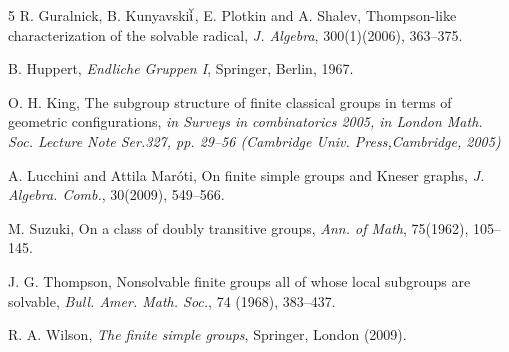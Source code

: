\documentclass{amsart}
\theoremstyle{definition}
\theoremstyle{remark}
\begin{document}
\begin{thebibliography}{5}
 R. Guralnick, B. Kunyavski${\rm \breve{i}}$, E. Plotkin and A. Shalev,  Thompson-like
characterization of the solvable radical, {\em J. Algebra},
300(1)(2006), 363--375.

 B. Huppert, {\em Endliche Gruppen I}, Springer, Berlin, 1967.

 O. H. King, The subgroup structure of finite classical groups in terms of geometric configurations, {\em in Surveys in combinatorics 2005, in London Math. Soc. Lecture Note Ser.327, pp. 29--56 (Cambridge Univ. Press,Cambridge, 2005)}

 A. Lucchini and Attila Maróti, On finite simple groups and Kneser graphs, {\em J. Algebra. Comb.}, 30(2009), 549--566.

 M. Suzuki, On a class of doubly transitive groups, {\em Ann. of Math}, 75(1962), 105--145.


 J. G. Thompson, Nonsolvable finite groups all of whose local subgroups are solvable, {\em  Bull. Amer. Math. Soc.},  74 (1968),  383--437.

 R. A. Wilson, {\em The finite simple groups}, Springer, 
London (2009).

\end{thebibliography}
\end{document}
